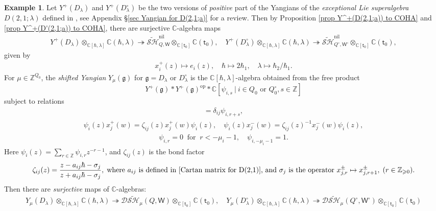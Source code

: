 \documentclass[10pt]{amsart}
\theoremstyle{definition}
\newtheorem{Example}[Theorem]{Example}
\numberwithin{equation}{section}
\newcommand{\bC}{\mathbb{C}}
\newcommand{\bZ}{\mathbb{Z}}
\newcommand{\sW}{\mathsf{W}}
\begin{document}
\begin{Example}
Let $Y^+(D_\lambda)$ and $Y^+(D^\circ_\lambda)$ be the two versions of \textit{positive} part of the Yangians of the \textit{exceptional Lie superalgebra} $D(2,1;\lambda)$ defined in \cite{LZ}, see Appendix \S\ref{sec Yangian for D(2,1;a)} for a review. Then by Proposition \ref{prop Y^+(D(2,1;a)) to COHA} and \ref{prop Y^+(D'(2,1;a)) to COHA}, there are surjective $\bC$-algebra maps
\begin{align*}
Y^+(D_\lambda)\otimes_{\bC[\hbar,\lambda]}\bC(\hbar,\lambda)\twoheadrightarrow \widetilde{\mathcal{SH}}^{\mathrm{nil}}_{Q,\sW}\otimes_{\bC[\mathsf t_0]}\bC(\mathsf t_0),\quad Y^+(D^\circ_\lambda)\otimes_{\bC[\hbar,\lambda]}\bC(\hbar,\lambda)\twoheadrightarrow \widetilde{\mathcal{SH}}^{\mathrm{nil}}_{Q^\circ,\sW^\circ}\otimes_{\bC[\mathsf t_0]}\bC(\mathsf t_0),
\end{align*}
given by
\begin{align*}
x^+_i(z)\mapsto e_i(z), \quad \hbar\mapsto 2\hbar_1,\quad \lambda\mapsto \hbar_2/\hbar_1.
\end{align*}
For $\mu\in \bZ^{Q_0}$, the \textit{shifted Yangian} $Y_\mu(\mathfrak{g})$ for $\mathfrak{g}=D_\lambda$ or $D^\circ_\lambda$ is the $\bC[\hbar,\lambda]$-algebra obtained from the free product $$Y^+(\mathfrak{g})* Y^+(\mathfrak{g})^{\mathrm{op}}*\bC[\psi_{i,s}\:|\: i\in Q_0\text{ or }Q^\circ_0,s\in \bZ]$$ subject to relations
\begin{align*}
    [x^+_{i,r},x^-_{j,s}]=\delta_{ij}\psi_{i,r+s},
\end{align*}
\begin{align}\label{relation for shifted affine yangian of D(2,1)}
    \psi_i(z)x^+_j(w)=\zeta_{ij}(z)x^+_j(w)\psi_i(z),\quad \psi_i(z)x^-_j(w)=\zeta_{ij}(z)^{-1}x^-_j(w)\psi_i(z),
\end{align}
\begin{align*}
    \psi_{i,r}=0\:\text{ for }\:r<-\mu_i-1,\quad \psi_{i,-\mu_i-1}=1.
\end{align*}
Here $\psi_i(z)=\sum_{r\in\bZ}\psi_{i,r}z^{-r-1}$, and $\zeta_{ij}(z)$ is the bond factor
\begin{align*}
    \zeta_{ij}(z)=\frac{z-a_{ij}\hbar-\sigma_j}{z+a_{ij}\hbar-\sigma_j},\;\text{where $a_{ij}$ is defined in \eqref{Cartan matrix for D(2,1)}, and $\sigma_j$ is the operator } x^\pm_{j,r}\mapsto x^\pm_{j,r+1},\;(r\in \bZ_{\geqslant0}).
\end{align*}
Then there are \textit{surjective} maps of $\bC$-algebras:
\begin{gather*}
Y_\mu(D_\lambda)\otimes_{\bC[\hbar,\lambda]}\bC(\hbar,\lambda)\twoheadrightarrow \mathcal D\widetilde{\mathcal{SH}}_\mu(Q,\sW)\otimes_{\bC[\mathsf t_0]}\bC(\mathsf t_0),\quad Y_\mu(D^\circ_\lambda)\otimes_{\bC[\hbar,\lambda]}\bC(\hbar,\lambda)\twoheadrightarrow \mathcal D\widetilde{\mathcal{SH}}_\mu(Q^\circ,\sW^\circ)\otimes_{\bC[\mathsf t_0]}\bC(\mathsf t_0)

\end{gather*}
\end{Example}
\end{document}
